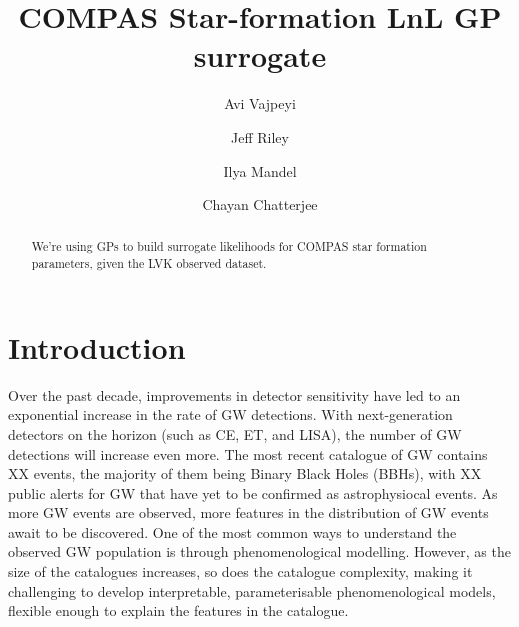 \documentclass[twocolumn]{aastex631}
\newcommand{\resp}[1]{#1}
\begin{document}
\title{\resp{COMPAS Star-formation LnL GP surrogate}}

\author{Avi Vajpeyi}

\author{Jeff Riley}
\author{Ilya Mandel}
\author{Chayan Chatterjee}
\affiliation{}




\begin{abstract}
    We're using GPs to build surrogate likelihoods for COMPAS star formation parameters, given the LVK observed dataset.
\end{abstract}




\section{Introduction}
\label{sec:intro}
Over the past decade, improvements in detector sensitivity have led to an exponential increase in the rate of GW detections.
With next-generation detectors on the horizon (such as CE, ET, and LISA), the number of GW detections will increase even more.
The most recent catalogue of GW contains
XX events, the majority of them being Binary Black Holes
(BBHs), with XX public alerts for GW that have yet to be confirmed as astrophysiocal events.
As more GW events are observed, more features
in the distribution of GW events await to be discovered.
One of the most common ways to understand the observed GW population is through phenomenological modelling.
However, as the size of the catalogues increases, so does the catalogue complexity, making it challenging to develop interpretable, parameterisable phenomenological models, flexible enough to explain the features in the catalogue.
\end{document}
